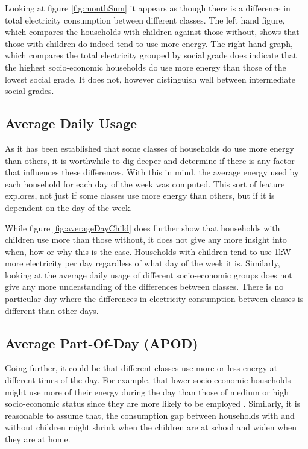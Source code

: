 \monthSum

Looking at figure \ref{fig:monthSum} it appears as though there is a difference in total electricity consumption between different classes. The left hand figure, which compares the households with children against those without, shows that those with children do indeed tend to use more energy. The right hand graph, which compares the total electricity grouped by social grade does indicate that the highest socio-economic households do use more energy than those of the lowest social grade. It does not, however distinguish well between intermediate social grades.

\subsection*{Average Daily Usage}
As it has been established that some classes of households do use more energy than others, it is worthwhile to dig deeper and determine if there is any factor that influences these differences. With this in mind, the average energy used by each household for each day of the week was computed. This sort of feature explores, not just if some classes use more energy than others, but if it is dependent on the day of the week. 

\averageDayChild
\averageDaySocio

While figure \ref{fig:averageDayChild} does further show that households with children use more than those without, it does not give any more insight into when, how or why this is the case. Households with children tend to use 1kW more electricity per day regardless of what day of the week it is.
Similarly, looking at the average daily usage of different socio-economic groups does not give any more understanding of the differences between classes. There is no particular day where the differences in electricity consumption between classes is different than other days.

\subsection*{Average Part-Of-Day (APOD)}
Going further, it could be that different classes use more or less energy at different times of the day. For example, that lower socio-economic households might use more of their energy during the day than those of medium or high socio-economic status since they are more likely to be employed \cite{Bartley}. Similarly, it is reasonable to assume that, the consumption gap between households with and without children might shrink when the children are at school and widen when they are at home.

